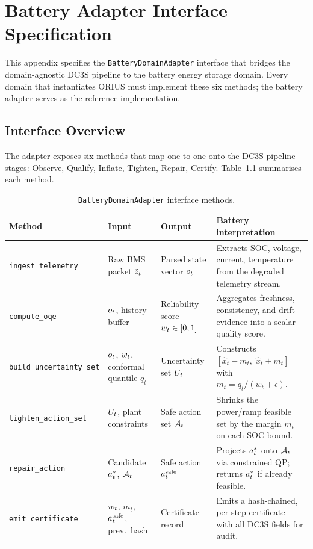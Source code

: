 \chapter{Battery Adapter Interface Specification}
\label{app:adapter-interface}

This appendix specifies the \texttt{BatteryDomainAdapter} interface that
bridges the domain-agnostic DC3S pipeline to the battery energy storage
domain.  Every domain that instantiates ORIUS must implement these six
methods; the battery adapter serves as the reference implementation.

\section{Interface Overview}

The adapter exposes six methods that map one-to-one onto the DC3S
pipeline stages: Observe, Qualify, Inflate, Tighten, Repair, Certify.
Table~\ref{tab:adapter-methods} summarises each method.

\begin{table}[htbp]
\centering
\caption{\texttt{BatteryDomainAdapter} interface methods.}
\label{tab:adapter-methods}
\scriptsize
\begin{tabular}{@{}p{4.0cm}p{2.7cm}p{2.8cm}p{3.5cm}@{}}
\toprule
\textbf{Method} & \textbf{Input} & \textbf{Output} & \textbf{Battery interpretation} \\
\midrule
\texttt{ingest\_telemetry}
  & Raw BMS packet $\tilde{z}_t$
  & Parsed state vector $o_t$
  & Extracts SOC, voltage, current, temperature from the degraded telemetry stream.
\\[4pt]
\texttt{compute\_oqe}
  & $o_t$, history buffer
  & Reliability score $w_t \in [0,1]$
  & Aggregates freshness, consistency, and drift evidence into a scalar quality score.
\\[4pt]
\texttt{build\_uncertainty\_set}
  & $o_t$, $w_t$, conformal quantile $q_t$
  & Uncertainty set $U_t$
  & Constructs $[\hat{x}_t - m_t,\;\hat{x}_t + m_t]$ with $m_t = q_t/(w_t + \epsilon)$.
\\[4pt]
\texttt{tighten\_action\_set}
  & $U_t$, plant constraints
  & Safe action set $\mathcal{A}_t$
  & Shrinks the power/ramp feasible set by the margin $m_t$ on each SOC bound.
\\[4pt]
\texttt{repair\_action}
  & Candidate $a_t^{*}$, $\mathcal{A}_t$
  & Safe action $a_t^{\mathrm{safe}}$
  & Projects $a_t^{*}$ onto $\mathcal{A}_t$ via constrained QP; returns $a_t^{*}$ if already feasible.
\\[4pt]
\texttt{emit\_certificate}
  & $w_t$, $m_t$, $a_t^{\mathrm{safe}}$, prev.\ hash
  & Certificate record
  & Emits a hash-chained, per-step certificate with all DC3S fields for audit.
\\
\bottomrule
\end{tabular}
\end{table}

